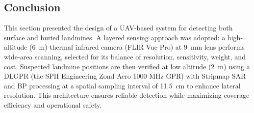 \subsection{Conclusion}\label{Huirui_conclusion}

This section presented the design of a \gls{UAV}-based system for detecting both surface and buried landmines. A layered sensing approach was adopted: a high-altitude (6~m) thermal infrared camera (FLIR Vue Pro) at 9~mm lens performs wide-area scanning, selected for its balance of resolution, sensitivity, weight, and cost. Suspected landmine positions are then verified at low altitude (2~m) using a \gls{DLGPR} (the SPH Engineering Zond Aero 1000 MHz \gls{GPR}) with Stripmap \gls{SAR} and \gls{BP} processing at a spatial sampling interval of 11.5~cm to enhance lateral resolution. This architecture ensures reliable detection while maximizing coverage efficiency and operational safety.